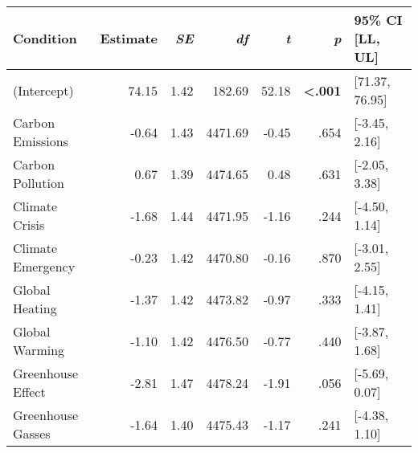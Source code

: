 \begin{table}[ht]
\centering
\begin{tabular}{lrrrrrl}
  \hline
Condition & Estimate & \textit{SE} & \textit{df} & \textit{t} & \textit{p} & 95\% CI [LL, UL] \\ 
  \hline
(Intercept) & 74.15 & 1.42 & 182.69 & 52.18 & \textbf{\textless  .001} & [71.37, 76.95] \\ 
  Carbon Emissions & -0.64 & 1.43 & 4471.69 & -0.45 & .654 & [-3.45, 2.16] \\ 
  Carbon Pollution & 0.67 & 1.39 & 4474.65 & 0.48 & .631 & [-2.05, 3.38] \\ 
  Climate Crisis & -1.68 & 1.44 & 4471.95 & -1.16 & .244 & [-4.50, 1.14] \\ 
  Climate Emergency & -0.23 & 1.42 & 4470.80 & -0.16 & .870 & [-3.01, 2.55] \\ 
  Global Heating & -1.37 & 1.42 & 4473.82 & -0.97 & .333 & [-4.15, 1.41] \\ 
  Global Warming & -1.10 & 1.42 & 4476.50 & -0.77 & .440 & [-3.87, 1.68] \\ 
  Greenhouse Effect & -2.81 & 1.47 & 4478.24 & -1.91 & .056 & [-5.69, 0.07] \\ 
  Greenhouse Gasses & -1.64 & 1.40 & 4475.43 & -1.17 & .241 & [-4.38, 1.10] \\ 
   \hline
\end{tabular}
\end{table}
